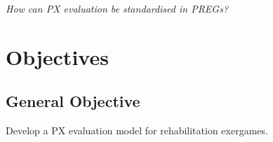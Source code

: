 \begin{center} 
\emph{How can \ac{PX} evaluation be standardised in \acp{PREG}?}
\end{center} 





\section{Objectives}\label{sec:objectives}

\subsection{General Objective} 
Develop a \ac{PX} evaluation model for rehabilitation exergames.

